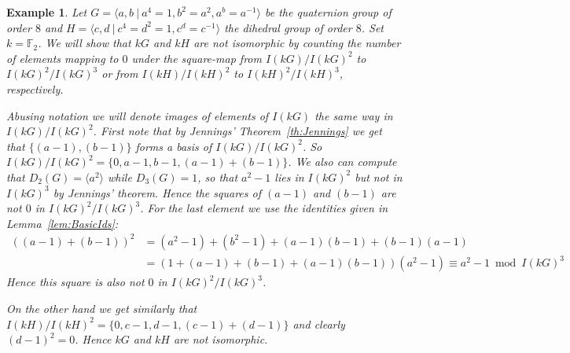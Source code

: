 \documentclass[11pt, a4paper]{amsart}
\newtheorem{example}[theorem]{Example}
\theoremstyle{definition}
\begin{document}
\begin{example}
Let $G = \langle a, b \ | \ a^4 = 1, b^2 = a^2, a^b = a^{-1} \rangle$ be the quaternion group of order $8$ and $H = \langle c, d \ | \ c^4 = d^2 = 1, c^d = c^{-1} \rangle$ the dihedral group of order $8$. Set $k = \mathbb{F}_2$. We will show that $kG$ and $kH$ are not isomorphic by counting the number of elements mapping to $0$ under the square-map from $I(kG)/I(kG)^2$ to $I(kG)^2/I(kG)^3$ or from $I(kH)/I(kH)^2$ to $I(kH)^2/I(kH)^3$, respectively.

Abusing notation we will denote images of elements of $I(kG)$ the same way in $I(kG)/I(kG)^2$. First note that by Jennings' Theorem~\ref{th:Jennings} we get that $\{(a-1), (b-1)\}$ forms a basis of $I(kG)/I(kG)^2$.  So $I(kG)/I(kG)^2 = \{0, a-1, b-1, (a-1) + (b-1) \}$. We also can compute that $D_2(G) = \langle a^2 \rangle$ while $D_3(G) = 1$, so that $a^2-1$ lies in $I(kG)^2$ but not in $I(kG)^3$ by Jennings' theorem. Hence the squares of $(a-1)$ and $(b-1)$ are not $0$ in $I(kG)^2/I(kG)^3$. For the last element we use the identities given in Lemma~\ref{lem:BasicIds}:
\begin{align*}
((a-1) + (b-1))^2 &= (a^2-1) + (b^2-1) + (a-1)(b-1) + (b-1)(a-1) \\
&= ( 1+ (a-1)+(b-1)+(a-1)(b-1))(a^2-1) \equiv a^2-1 \bmod I(kG)^3 
\end{align*}
Hence this square is also not $0$ in $I(kG)^2/I(kG)^3$.

On the other hand we get similarly that $I(kH)/I(kH)^2 = \{0, c-1, d-1, (c-1) + (d-1) \}$ and clearly $(d-1)^2 = 0$. Hence $kG$ and $kH$ are not isomorphic.
\end{example} 
\end{document}
